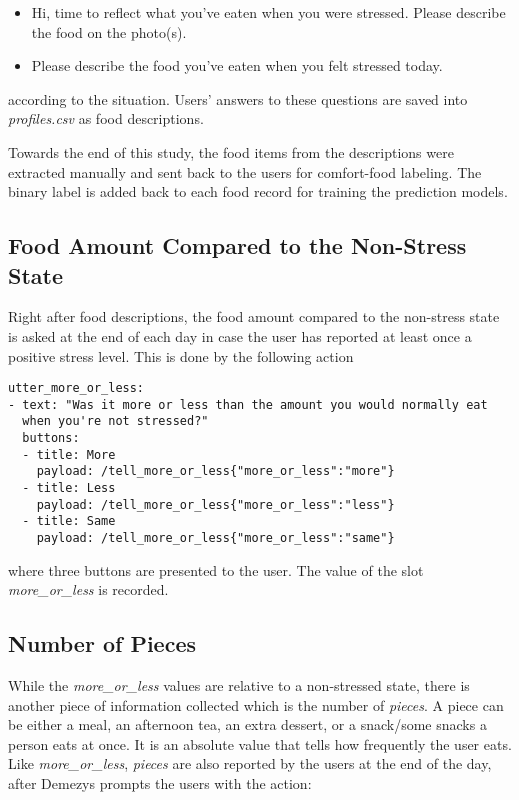 \begin{itemize}
  \item Hi, time to reflect what you've eaten when you were stressed. Please describe the food on the photo(s).
  \item Please describe the food you've eaten when you felt stressed today.
\end{itemize}

\noindent according to the situation. Users' answers to these questions are saved into \emph{profiles.csv} as food descriptions.

Towards the end of this study, the food items from the descriptions were extracted manually and sent back to the users for comfort-food labeling. The binary label is added back to each food record for training the prediction models.

\subsection{Food Amount Compared to the Non-Stress State}
Right after food descriptions, the food amount compared to the non-stress state is asked at the end of each day in case the user has reported at least once a positive stress level. This is done by the following action

\begin{lstlisting}
utter_more_or_less:
- text: "Was it more or less than the amount you would normally eat
  when you're not stressed?"
  buttons:
  - title: More
    payload: /tell_more_or_less{"more_or_less":"more"}
  - title: Less
    payload: /tell_more_or_less{"more_or_less":"less"}
  - title: Same
    payload: /tell_more_or_less{"more_or_less":"same"}
\end{lstlisting}

\noindent where three buttons are presented to the user. The value of the slot \emph{more\_or\_less} is recorded.

\subsection{Number of Pieces}
While the \emph{more\_or\_less} values are relative to a non-stressed state, there is another piece of information collected which is the number of \emph{pieces}. A piece can be either a meal, an afternoon tea, an extra dessert, or a snack/some snacks a person eats at once. It is an absolute value that tells how frequently the user eats. Like \emph{more\_or\_less}, \emph{pieces} are also reported by the users at the end of the day, after Demezys prompts the users with the action:

